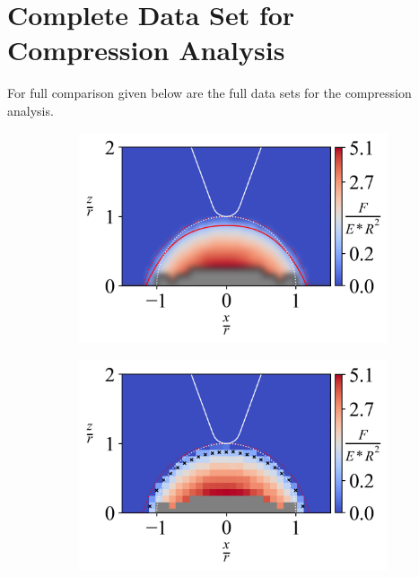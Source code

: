 \newpage
\section{Complete Data Set for Compression Analysis \label{Appendix: Complete Data Set for Compression Analysis}}

For full comparison given below are the full data sets for the compression analysis.

\begin{figure}[H]
\centering

    \begin{subfigure}{0.32\textwidth}
        \centering
        \caption{\label{fig: All-Hemisphere-ContourPlot-1}}
        \includegraphics[width=1\linewidth]{Figures/Hemisphere-ContourPlot-1.png}
    \end{subfigure}
    \hfill     
    \begin{subfigure}{0.32\textwidth}
        \centering
        \caption{\label{fig: All-Hemisphere-ContourPlotNI-1}}
        \includegraphics[width=1\linewidth]{Figures/Hemisphere-ContourPlotNI-1.png}

\end{subfigure}
\end{figure}
